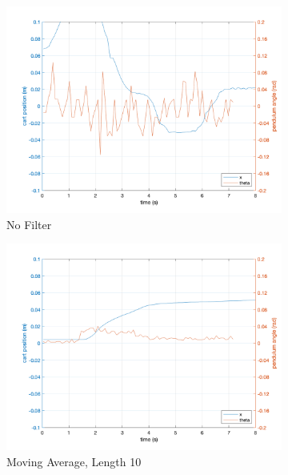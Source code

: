 \documentclass[12pt]{article}
\begin{document}
\begin{figure}[H]
    \centering
    \begin{subfigure}{.49\textwidth}
      \centering
      \includegraphics[width=1\linewidth]{figures/noAvg.png}
      \caption{No Filter}
    \end{subfigure}
    \begin{subfigure}{.49\textwidth}
      \centering
      \includegraphics[width=1\linewidth]{figures/movAvg10.png}
      \caption{Moving Average, Length 10}
    \end{subfigure}
    \begin{subfigure}{.6\textwidth}
      \centering

\end{subfigure}
\end{figure}
\end{document}
